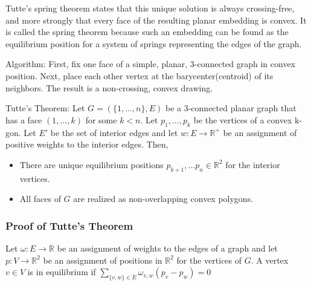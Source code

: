 \documentclass[english]{article}
\newcommand{\R}{\mathbb{R}}
\begin{document}
  Tutte's spring theorem states that this unique solution is always crossing-free, and more strongly that every face of the resulting planar embedding is convex. It is called the spring theorem because such an embedding can be found as the equilibrium position for a system of springs representing the edges of the graph.
  
  Algorithm: First, fix one face of a simple, planar, 3-connected graph in convex position. Next, place each other vertex at the barycenter(centroid) of its neighbors. The result is a non-crossing, convex drawing.
 
 Tutte's Theorem: Let $G = (\{1,...,n\},E)$ be a 3-connected planar graph that has a face $(1,...,k)$ for some $k<n$. Let $p_1,...,p_k$ be the vertices of a convex k-gon. Let $E'$ be the set of interior edges and let $w : E \rightarrow \R^+$ be an assignment of positive weights to the interior edges. Then,
 	\begin{itemize}
		\item There are unique equilibrium positions $p_{k+1}, ...p_n \in \R^2$ for the interior vertices. 
		\item All faces of $G$ are realized as non-overlapping convex polygons.
	\end{itemize}
	
	
\subsubsection{Proof of Tutte's Theorem}
Let $\omega : E \rightarrow \R$ be an assignment of weights to the edges of a graph and let $p:V \rightarrow \R^2$ be an assignment of positions in $\R^2$ for the vertices of $G$. A vertex $v \in V$ is in equilibrium if  $\sum\limits_{\{v,w\} \in E} \omega_{v,w}(p_v - p_w) = 0$
\end{document}
